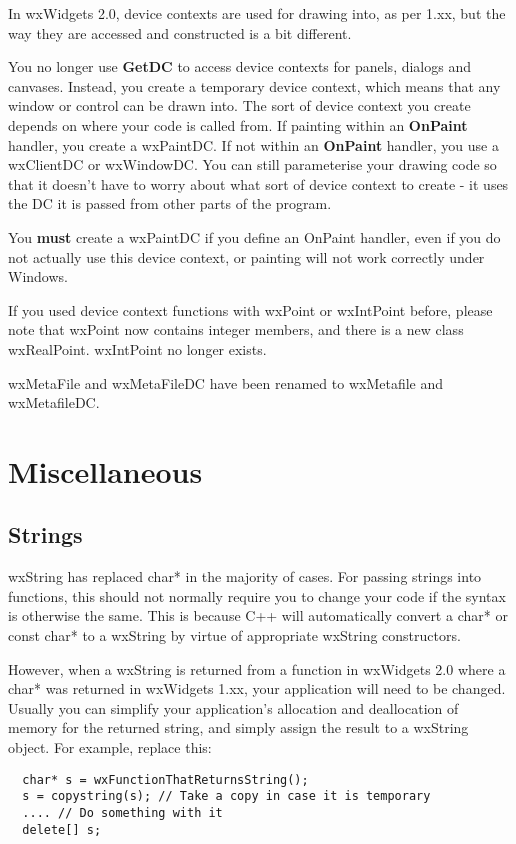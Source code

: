 In wxWidgets 2.0, device contexts are used for drawing into, as per 1.xx, but the way
they are accessed and constructed is a bit different.

You no longer use {\bf GetDC} to access device contexts for panels, dialogs and canvases.
Instead, you create a temporary device context, which means that any window or control can be drawn
into. The sort of device context you create depends on where your code is called from. If
painting within an {\bf OnPaint} handler, you create a wxPaintDC. If not within an {\bf OnPaint} handler,
you use a wxClientDC or wxWindowDC. You can still parameterise your drawing code so that it
doesn't have to worry about what sort of device context to create - it uses the DC it is passed
from other parts of the program.

You {\bf must } create a wxPaintDC if you define an OnPaint handler, even if you do not
actually use this device context, or painting will not work correctly under Windows.

If you used device context functions with wxPoint or wxIntPoint before, please note
that wxPoint now contains integer members, and there is a new class wxRealPoint. wxIntPoint
no longer exists.

wxMetaFile and wxMetaFileDC have been renamed to wxMetafile and wxMetafileDC.

\section{Miscellaneous}

\subsection{Strings}

wxString has replaced char* in the majority of cases. For passing strings into functions,
this should not normally require you to change your code if the syntax is otherwise the
same. This is because C++ will automatically convert a char* or const char* to a wxString by virtue
of appropriate wxString constructors.

However, when a wxString is returned from a function in wxWidgets 2.0 where a char* was
returned in wxWidgets 1.xx, your application will need to be changed. Usually you can
simplify your application's allocation and deallocation of memory for the returned string,
and simply assign the result to a wxString object. For example, replace this:

{\small
\begin{verbatim}
  char* s = wxFunctionThatReturnsString();
  s = copystring(s); // Take a copy in case it is temporary
  .... // Do something with it
  delete[] s;
\end{verbatim}
}

